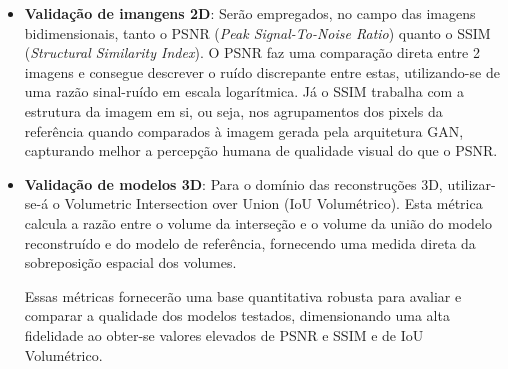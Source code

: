 \begin{itemize}

  \item \textbf{Validação de imangens 2D}: Serão empregados, no campo das imagens bidimensionais, tanto o PSNR (\textit{Peak Signal-To-Noise Ratio}) quanto o SSIM (\textit{Structural Similarity Index}). O PSNR faz uma comparação direta entre 2 imagens e consegue descrever o ruído discrepante entre estas, utilizando-se de uma razão sinal-ruído em escala logarítmica. Já o SSIM trabalha com a estrutura da imagem em si, ou seja, nos agrupamentos dos pixels da referência quando comparados à imagem gerada pela arquitetura GAN, capturando melhor a percepção humana de qualidade visual do que o PSNR.

  \item \textbf{Validação de modelos 3D}: Para o domínio das reconstruções 3D, utilizar-se-á o Volumetric Intersection over Union (IoU Volumétrico). Esta métrica calcula a razão entre o volume da interseção e o volume da união do modelo reconstruído e do modelo de referência, fornecendo uma medida direta da sobreposição espacial dos volumes.

Essas métricas fornecerão uma base quantitativa robusta para avaliar e comparar a qualidade dos modelos testados, dimensionando uma alta fidelidade ao obter-se valores elevados de PSNR e SSIM e de IoU Volumétrico.

\end{itemize}